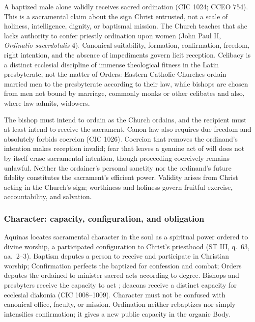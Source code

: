 A baptized male alone validly receives sacred ordination (CIC 1024; CCEO 754). This is a sacramental claim about the sign Christ entrusted, not a scale of holiness, intelligence, dignity, or baptismal mission. The Church teaches that she lacks authority to confer priestly ordination upon women (John Paul II, \emph{Ordinatio sacerdotalis} 4). Canonical suitability, formation, confirmation, freedom, right intention, and the absence of impediments govern licit reception. Celibacy is a distinct ecclesial discipline of immense theological fitness in the Latin presbyterate, not the matter of Orders: Eastern Catholic Churches ordain married men to the presbyterate according to their law, while bishops are chosen from men not bound by marriage, commonly monks or other celibates and also, where law admits, widowers.

The bishop must intend to ordain as the Church ordains, and the recipient must at least intend to receive the sacrament. Canon law also requires due freedom and absolutely forbids coercion (CIC 1026). Coercion that removes the ordinand's intention makes reception invalid; fear that leaves a genuine act of will does not by itself erase sacramental intention, though proceeding coercively remains unlawful. Neither the ordainer's personal sanctity nor the ordinand's future fidelity constitutes the sacrament's efficient power. Validity arises from Christ acting in the Church's sign; worthiness and holiness govern fruitful exercise, accountability, and salvation.

\subsubsection{Character: capacity, configuration, and obligation}

Aquinas locates sacramental character in the soul as a spiritual power ordered to divine worship, a participated configuration to Christ's priesthood (ST III, q.~63, aa.~2--3). Baptism deputes a person to receive and participate in Christian worship; Confirmation perfects the baptized for confession and combat; Orders deputes the ordained to minister sacred acts according to degree. Bishops and presbyters receive the capacity to act ; deacons receive a distinct capacity for ecclesial diakonia (CIC 1008--1009). Character must not be confused with canonical office, faculty, or mission. Ordination neither rebaptizes nor simply intensifies confirmation; it gives a new public capacity in the organic Body.

